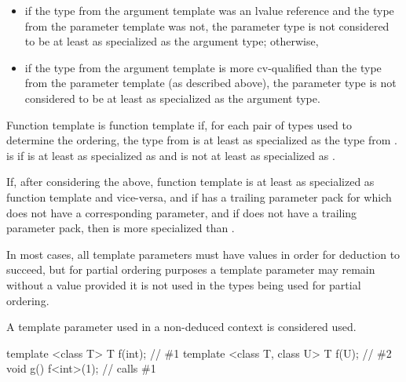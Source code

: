 \begin{itemize}
\item if the type from the argument template was an lvalue reference and the type
from the parameter template was not,
the parameter type is not considered to be
at least as specialized as the argument type; otherwise,

\item if the type from
the argument template is more cv-qualified than the type from the
parameter template (as described above),
the parameter type is not considered to be
at least as specialized as the argument type.
\end{itemize}

\pnum
{}%
Function template 
is 
function template  if,
for each pair of types used to determine the ordering,
the type from 
is at least as specialized as
the type from .
is 
 if
is at least as specialized as
 and
is not at least as specialized as
.

\pnum
If, after considering the above, function template 
is at least as specialized as function template  and vice-versa, and
if  has a trailing parameter pack
for which  does not have a corresponding parameter, and
if  does not have a trailing parameter pack,
then  is more specialized than .

\pnum
In most cases, all template parameters must have values in order for
deduction to succeed, but for partial ordering purposes a template
parameter may remain without a value provided it is not used in the
types being used for partial ordering.
\begin{note}
A template parameter used in a non-deduced context is considered used.
\end{note}
\begin{example}
\begin{codeblock}
template <class T> T f(int);        // \#1
template <class T, class U> T f(U); // \#2
void g() {
  f<int>(1);        // calls \#1
}
\end{codeblock}
\end{example}

